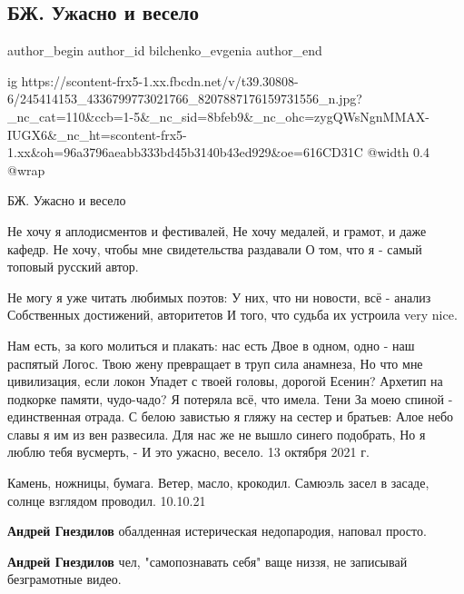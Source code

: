  
 
 
 
 
 
\subsection{БЖ. Ужасно и весело}
\label{sec:13_10_2021.fb.bilchenko_evgenia.1.uzhasno_i_veselo}
 
\ifcmt
 author_begin
   author_id bilchenko_evgenia
 author_end
\fi

\ifcmt
  ig https://scontent-frx5-1.xx.fbcdn.net/v/t39.30808-6/245414153_4336799773021766_8207887176159731556_n.jpg?_nc_cat=110&ccb=1-5&_nc_sid=8bfeb9&_nc_ohc=zygQWsNgnMMAX-IUGX6&_nc_ht=scontent-frx5-1.xx&oh=96a3796aeabb333bd45b3140b43ed929&oe=616CD31C
  @width 0.4
  @wrap 
\fi

БЖ. Ужасно и весело

Не хочу я аплодисментов и фестивалей,
Не хочу медалей, и грамот, и даже кафедр.
Не хочу, чтобы мне свидетельства раздавали
О том, что я - самый топовый русский автор.

Не могу я уже читать любимых поэтов:
У них, что ни новости, всё - анализ
Собственных достижений, авторитетов
И того, что судьба их устроила very nice.

Нам есть, за кого молиться и плакать: нас есть
Двое в одном, одно - наш распятый Логос.
Твою жену превращает в труп сила анамнеза,
Но что мне цивилизация, если локон
Упадет с твоей головы, дорогой Есенин?
Архетип на подкорке памяти, чудо-чадо?
Я потеряла всё, что имела. Тени 
За моею спиной - единственная отрада.
С белою завистью я гляжу на сестер и братьев:
Алое небо славы я им из вен развесила.
Для нас же не вышло синего подобрать,
Но я люблю тебя вусмерть, -
И это ужасно, весело.
13 октября 2021 г.

\begin{itemize} %
Камень, ножницы, бумага.
Ветер, масло, крокодил.
Самюэль засел в засаде, солнце взглядом проводил.
10.10.21

\begin{itemize} %
\textbf{Андрей Гнездилов} обалденная истерическая недопародия, наповал просто.

\textbf{Андрей Гнездилов} чел, "самопознавать себя" ваще низзя, не записывай безграмотные видео.
\end{itemize} %

\end{itemize} %
